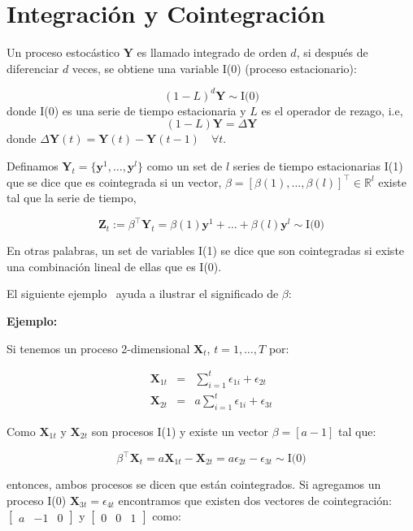 \section{Integración y Cointegración}
Un proceso estocástico $\mathbf{Y}$ es llamado integrado de orden $d$, si
después de diferenciar $d$ veces, se obtiene una variable I(0) (proceso
estacionario):

\[
(1-L)^d \mathbf{Y} \sim \text{I(0)}
\]
\noindent donde I(0) es una serie de tiempo estacionaria y $L$ es el operador de rezago, i.e,
\[
(1-L)\mathbf{Y} = \Delta \mathbf{Y}
\]
\noindent donde $\Delta \mathbf{Y}(t) = \mathbf{Y}(t)  -\mathbf{Y}(t-1) \quad \forall t $.

Definamos $\mathbf{Y}_t = \{\mathbf{y}^1, \dots, \mathbf{y}^l\}$ como un set de $l$ series de tiempo estacionarias 
I(1) que se dice que es cointegrada si un vector,
$\beta=[\beta(1),\dots,\beta(l)]^\intercal \in \mathbb{R}^l$  existe tal que la serie de tiempo, 

\begin{equation}
 \mathbf{Z}_t:= \beta^\intercal \mathbf{Y}_t = \beta(1) \mathbf{y}^1 + \dots + \beta(l) \mathbf{y}^l \sim
  \text{I(0)}
  \end{equation}

En otras palabras, un set de variables I(1) se dice que son cointegradas si
existe una combinación lineal de ellas que es I(0).

El siguiente ejemplo~\cite{johansen1995} ayuda a ilustrar el significado de
$\beta$:

\textbf{Ejemplo:}

Si tenemos un proceso 2-dimensional $\mathbf{X}_t$, $t=1,\dots,T$ por:

\begin{eqnarray*}
\mathbf{X}_{1t} &=& \sum_{i=1}^t \epsilon_{1i} + \epsilon_{2t} \\
\mathbf{X}_{2t} &=& a \sum_{i=1}^t \epsilon_{1i} + \epsilon_{3t} 
\end{eqnarray*}

Como $\mathbf{X}_{1t}$ y $\mathbf{X}_{2t}$ son procesos I(1) y existe un vector
$\beta = [a -1]$ tal que:

\[
\beta^\intercal \mathbf{X}_t = a \mathbf{X}_{1t} -\mathbf{X}_{2t} = 
a\epsilon_{2t} - \epsilon_{3t} \sim \text{I(0)}
\]

entonces, ambos procesos se dicen que están cointegrados. Si agregamos un proceso I(0)
$\mathbf{X}_{3t} = \epsilon_{4t}$ encontramos que existen dos vectores de cointegración: 
$\begin{bmatrix}a &-1& 0\end{bmatrix}$ y $\begin{bmatrix}0
&0&1\end{bmatrix}$ como:

